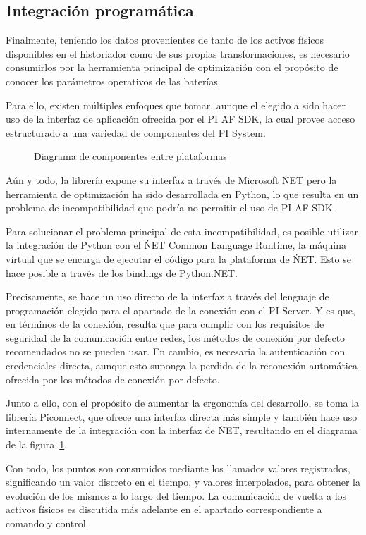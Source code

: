 \subsection{Integración programática}
\label{makereference3.5.2}

Finalmente, teniendo los datos provenientes de tanto de los activos físicos disponibles en el historiador como de sus propias transformaciones, es necesario consumirlos por la herramienta principal de optimización con el propósito de conocer los parámetros operativos de las baterías.

Para ello, existen múltiples enfoques que tomar, aunque el elegido a sido hacer uso de la interfaz de aplicación ofrecida por el PI AF SDK, la cual provee acceso estructurado a una variedad de componentes del PI System.

\begin{figure}
  \centering
  \caption{Diagrama de componentes entre plataformas}
  \label{fig:integración-programatica}
\end{figure}

Aún y todo, la librería expone su interfaz a través de Microsoft \.NET pero la herramienta de optimización ha sido desarrollada en Python, lo que resulta en un problema de incompatibilidad que podría no permitir el uso de PI AF SDK\@.

Para solucionar el problema principal de esta incompatibilidad, es posible utilizar la integración de Python con el \.NET Common Language Runtime, la máquina virtual que se encarga de ejecutar el código para la plataforma de \.NET\@. Esto se hace posible a través de los bindings de Python.NET\@.

Precisamente, se hace un uso directo de la interfaz a través del lenguaje de programación elegido para el apartado de la conexión con el PI Server. Y es que, en términos de la conexión, resulta que para cumplir con los requisitos de seguridad de la comunicación entre redes, los métodos de conexión por defecto recomendados no se pueden usar. En cambio, es necesaria la autenticación con credenciales directa, aunque esto suponga la perdida de la reconexión automática ofrecida por los métodos de conexión por defecto.

Junto a ello, con el propósito de aumentar la ergonomía del desarrollo, se toma la librería Piconnect, que ofrece una interfaz directa más simple y también hace uso internamente de la integración con la interfaz de \.NET, resultando en el diagrama de la figura~\ref{fig:integración-programatica}.

Con todo, los puntos son consumidos mediante los llamados valores registrados, significando un valor discreto en el tiempo, y valores interpolados, para obtener la evolución de los mismos a lo largo del tiempo. La comunicación de vuelta a los activos físicos es discutida más adelante en el apartado correspondiente a comando y control.

